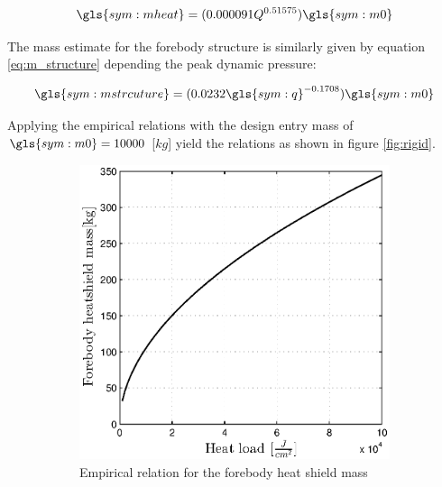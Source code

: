 \begin{equation}
\gls{sym:mheat} = (0.000091Q^{0.51575})\gls{sym:m0}
\label{eq:tps_heat}
\end{equation}

The mass estimate for the forebody structure is similarly given by equation \ref{eq:m_structure}\cite{Steinfeldt2009} depending the peak dynamic pressure:

\begin{equation}
\gls{sym:mstrcuture} = (0.0232 \gls{sym:q} ^{-0.1708} ) \gls{sym:m0}
\label{eq:m_structure}
\end{equation}

Applying the empirical relations with the design entry mass of $\gls{sym:m0} = 10000$ [$kg$] yield the relations as shown in figure \ref{fig:rigid}.

\begin{figure}[h]
	\centering
	\begin{subfigure}[b]{0.49\textwidth}
	\centering
	\includegraphics[width=1.0\textwidth]{Figure/rigidheat.eps}
	\caption{Empirical relation for the forebody heat shield mass} 
	\label{rigidheat}
	\end{subfigure}
	\begin{subfigure}[b]{0.49\textwidth}
	\centering

\end{subfigure}
\end{figure}
